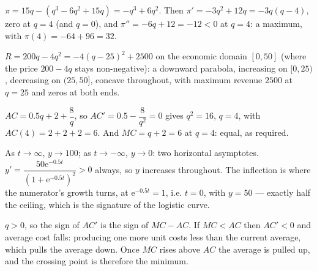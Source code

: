 \begin{solutions}
  \item $\pi=15q-(q^{3}-6q^{2}+15q)=-q^{3}+6q^{2}$. Then
        $\pi'=-3q^{2}+12q=-3q(q-4)$, zero at $q=4$ (and $q=0$), and
        $\pi''=-6q+12=-12<0$ at $q=4$: a maximum, with
        $\pi(4)=-64+96=32$.
  \item $R=200q-4q^{2}=-4(q-25)^{2}+2500$ on the economic domain
        $[0,50]$ (where the price $200-4q$ stays non-negative): a downward
        parabola, increasing on $[0,25)$, decreasing on $(25,50]$, concave
        throughout, with maximum revenue $2500$ at $q=25$ and zeros at both
        ends.
  \item $AC=0.5q+2+\dfrac{8}{q}$, so $AC'=0.5-\dfrac{8}{q^{2}}=0$ gives
        $q^{2}=16$, $q=4$, with $AC(4)=2+2+2=6$. And $MC=q+2=6$ at $q=4$:
        equal, as required.
  \item As $t\to\infty$, $y\to100$; as $t\to-\infty$, $y\to0$: two
        horizontal asymptotes. $y'=\dfrac{50\mathrm{e}^{-0.5t}}
        {(1+\mathrm{e}^{-0.5t})^{2}}>0$ always, so $y$ increases
        throughout. The inflection is where the numerator's growth turns,
        at $\mathrm{e}^{-0.5t}=1$, i.e. $t=0$, with $y=50$ --- exactly half
        the ceiling, which is the signature of the logistic curve.
  \item $q>0$, so the sign of $AC'$ is the sign of $MC-AC$. If
        $MC<AC$ then $AC'<0$ and average cost falls: producing one more
        unit costs less than the current average, which pulls the average
        down. Once $MC$ rises above $AC$ the average is pulled up, and the
        crossing point is therefore the minimum.
\end{solutions}

\begin{gallery}
\hfill
{}
\end{gallery}

